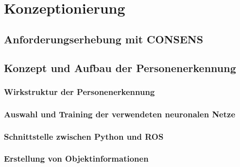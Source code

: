 \chapter{Konzeptionierung}
\label{ch: Konzeptionierung}

	
	
	\section{Anforderungserhebung mit CONSENS}
	\label{sec: Anforderungserhebung}
			
	
	\section{Konzept und Aufbau der Personenerkennung}
	
		\subsection{Wirkstruktur der Personenerkennung}
		
		\subsection{Auswahl und Training der verwendeten neuronalen Netze}
		
		\subsection{Schnittstelle zwischen Python und ROS}
		
		\subsection{Erstellung von Objektinformationen}
	
